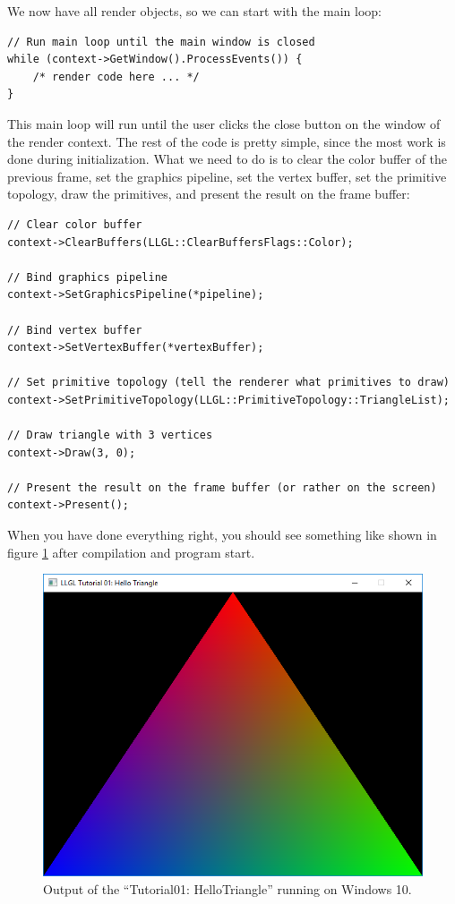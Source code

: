 \documentclass{article}
\begin{document}
We now have all render objects, so we can start with the main loop:
\begin{lstlisting}
// Run main loop until the main window is closed
while (context->GetWindow().ProcessEvents()) {
    /* render code here ... */
}
\end{lstlisting}
This main loop will run until the user clicks the close button on the window of the render context.
The rest of the code is pretty simple, since the most work is done during initialization.
What we need to do is to clear the color buffer of the previous frame,
set the graphics pipeline, set the vertex buffer, set the primitive topology,
draw the primitives, and present the result on the frame buffer:
\begin{lstlisting}
// Clear color buffer
context->ClearBuffers(LLGL::ClearBuffersFlags::Color);

// Bind graphics pipeline
context->SetGraphicsPipeline(*pipeline);

// Bind vertex buffer
context->SetVertexBuffer(*vertexBuffer);

// Set primitive topology (tell the renderer what primitives to draw)
context->SetPrimitiveTopology(LLGL::PrimitiveTopology::TriangleList);

// Draw triangle with 3 vertices
context->Draw(3, 0);

// Present the result on the frame buffer (or rather on the screen)
context->Present();
\end{lstlisting}
When you have done everything right, you should see something like shown in figure \ref{fig:tut01_mask1} after compilation
and program start.
\begin{figure}[H]
	\centering
	\includegraphics[width=0.8 \textwidth]{tut01_mask1a}
	\caption{Output of the ``Tutorial01: HelloTriangle'' running on Windows 10.}
	\label{fig:tut01_mask1}
\end{figure}







\end{document}
